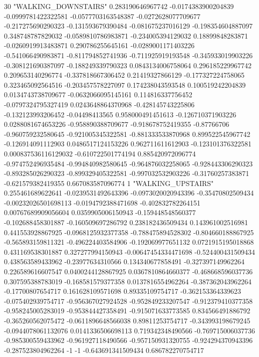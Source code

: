 30 "WALKING_DOWNSTAIRS" 0.283190646967742 -0.0174383900204839 -0.0999781422322581 -0.0577703163548387 -0.0272628077709677 -0.217275690290323 -0.131593679390484 -0.081675237016129 -0.198354604887097 0.348748787829032 -0.0589810786983871 -0.234005394129032 0.18899848283871 -0.0260919913483871 0.290786255645161 -0.0289001171403226 -0.541066490983871 -0.811794852741936 -0.711925919193548 -0.345933019903226 -0.308121690387097 -0.188249339790323 0.0843134006758064 0.296185229967742 0.209653140296774 -0.337818667306452 0.21419327866129 -0.177327224758065 0.323465092564516 -0.203457578227097 0.174238043593548 0.100519242204839 0.0134743738709677 -0.0632066095145161 0.114816337756452 -0.0797324795327419 0.0243648864370968 -0.428145743225806 -0.132123993206452 -0.04498413565 0.958000491451613 -0.126710371903226 0.0288081674653226 -0.958890388709677 -0.918678752419355 -0.87766706 -0.960759232580645 -0.921005345322581 -0.881333533870968 0.899522545967742 -0.126914091112903 0.0486517124153226 0.962711611612903 -0.123101376322581 0.000837536116129032 -0.610722501774194 0.885420972096774 -0.974752496935484 -0.994840982580645 -0.964876032258065 -0.928443306290323 -0.893285026290323 -0.899329405322581 -0.997032532903226 -0.31760257383871 -0.621579382419355 0.667083587096774
1 "WALKING_UPSTAIRS" 0.255461689622641 -0.0239531492643396 -0.0973020020943396 -0.35470802509434 -0.00232026501698113 -0.0194792388471698 -0.402832782264151 0.00767689909056604 0.0359905006150943 -0.159448548560377 -0.102688458301887 -0.160509697286792 0.238182436509434 0.143961002516981 0.441553928867925 -0.0968125932377358 -0.788475894528302 -0.804660188867925 -0.565893159811321 -0.496224403584906 -0.192069977651132 0.0721915195018868 0.431169538301887 0.327277994150943 -0.00647454334471698 -0.524400431509434 0.438563589433962 -0.23977634310566 0.134340677858491 -0.327397149962264 0.226589616607547 0.0400244128867925 0.0367810864660377 -0.468668596037736 0.307595388783019 -0.168581579377358 0.0137816554962264 -0.387362043962264 -0.17700807654717 0.161628109571698 0.89335109754717 -0.362153364339623 -0.075402939754717 -0.956367027924528 -0.952849233207547 -0.912379410377358 -0.958245005283019 -0.953844427358491 -0.915071633773585 0.834566491886792 -0.365260562075472 -0.0611896648566038 0.89811253754717 -0.343993198679245 -0.0944078061132076 0.0141336506698113 0.719342348490566 -0.769715006037736 -0.985300559433962 -0.961927118490566 -0.957150931320755 -0.924294370943396 -0.287523804962264 -1 -1 -0.643691341509434 0.686782270754717

